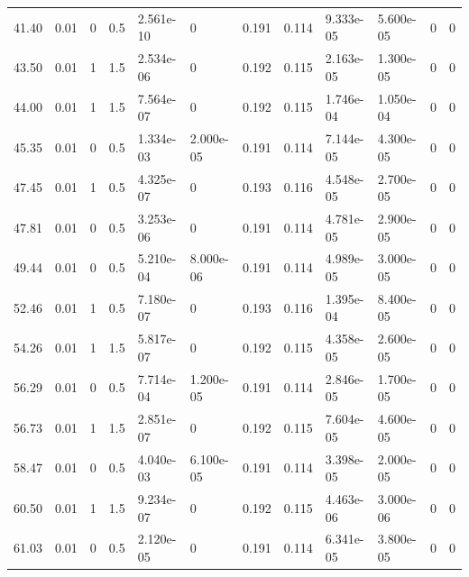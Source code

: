 \documentclass[preview]{standalone}
\begin{document}
{{\begin{tabular}{L{1.2cm}C{1.2cm} C{0.3cm}C{0.5cm} C{1.4cm}C{1.4cm} C{1.4cm}C{1.4cm} C{1.6cm}C{1.6cm} C{1.6cm}C{1.6cm}}
  41.40  &  0.01  & 0     & 0.5 &  2.561e-10  & 0  &  0.191&   0.114& 9.333e-05 & 5.600e-05   &  0 & 0  \\ 
  43.50  &  0.01  & 1     & 1.5 &  2.534e-06  & 0  &  0.192&   0.115& 2.163e-05 & 1.300e-05   &  0 & 0  \\ 
  44.00  &  0.01  & 1     & 1.5 &  7.564e-07  & 0  &  0.192&   0.115& 1.746e-04 & 1.050e-04   &  0 & 0  \\ 
  45.35  &  0.01  & 0     & 0.5 &  1.334e-03  & 2.000e-05  &  0.191&   0.114& 7.144e-05 & 4.300e-05   &  0 & 0  \\ 
  47.45  &  0.01  & 1     & 0.5 &  4.325e-07  & 0  &  0.193&   0.116& 4.548e-05 & 2.700e-05   &  0 & 0  \\ 
  47.81  &  0.01  & 0     & 0.5 &  3.253e-06  & 0  &  0.191&   0.114& 4.781e-05 & 2.900e-05   &  0 & 0  \\ 
  49.44  &  0.01  & 0     & 0.5 &  5.210e-04  & 8.000e-06  &  0.191&   0.114& 4.989e-05 & 3.000e-05   &  0 & 0  \\ 
  52.46  &  0.01  & 1     & 0.5 &  7.180e-07  & 0  &  0.193&   0.116& 1.395e-04 & 8.400e-05   &  0 & 0  \\ 
  54.26  &  0.01  & 1     & 1.5 &  5.817e-07  & 0  &  0.192&   0.115& 4.358e-05 & 2.600e-05   &  0 & 0  \\ 
  56.29  &  0.01  & 0     & 0.5 &  7.714e-04  & 1.200e-05  &  0.191&   0.114& 2.846e-05 & 1.700e-05   &  0 & 0  \\ 
  56.73  &  0.01  & 1     & 1.5 &  2.851e-07  & 0  &  0.192&   0.115& 7.604e-05 & 4.600e-05   &  0 & 0  \\ 
  58.47  &  0.01  & 0     & 0.5 &  4.040e-03  & 6.100e-05  &  0.191&   0.114& 3.398e-05 & 2.000e-05   &  0 & 0  \\ 
  60.50  &  0.01  & 1     & 1.5 &  9.234e-07  & 0  &  0.192&   0.115& 4.463e-06 & 3.000e-06   &  0 & 0  \\ 
  61.03  &  0.01  & 0     & 0.5 &  2.120e-05  & 0  &  0.191&   0.114& 6.341e-05 & 3.800e-05   &  0 & 0  \\ 
\hline 
\end{tabular} 

}}
\end{document}

